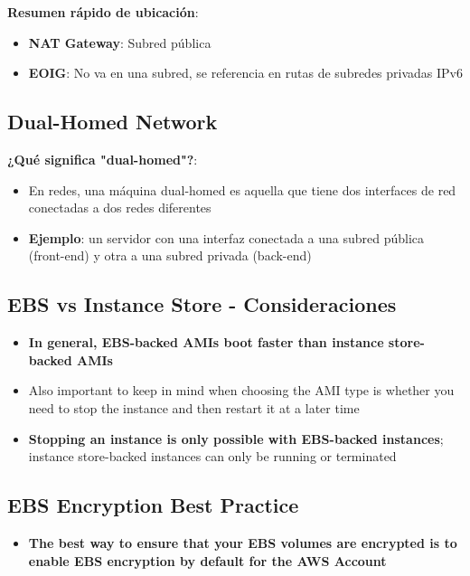 \documentclass[12pt,a4paper]{report}
\newcommand{\important}[1]{\textcolor{dangerred}{\textbf{#1}}}
\begin{document}
\textbf{Resumen rápido de ubicación}:
\begin{itemize}
    \item \textbf{NAT Gateway}: Subred pública
    \item \textbf{EOIG}: No va en una subred, se referencia en rutas de subredes privadas IPv6
\end{itemize}

\subsection{Dual-Homed Network}

\textbf{¿Qué significa "dual-homed"?}:
\begin{itemize}
    \item En redes, una máquina dual-homed es aquella que tiene dos interfaces de red conectadas a dos redes diferentes
    \item \textbf{Ejemplo}: un servidor con una interfaz conectada a una subred pública (front-end) y otra a una subred privada (back-end)
\end{itemize}

\subsection{EBS vs Instance Store - Consideraciones}

\begin{itemize}
    \item \important{In general, EBS-backed AMIs boot faster than instance store-backed AMIs}
    \item Also important to keep in mind when choosing the AMI type is whether you need to stop the instance and then restart it at a later time
    \item \textbf{Stopping an instance is only possible with EBS-backed instances}; instance store-backed instances can only be running or terminated
\end{itemize}

\subsection{EBS Encryption Best Practice}

\begin{itemize}
    \item \important{The best way to ensure that your EBS volumes are encrypted is to enable EBS encryption by default for the AWS Account}
\end{itemize}
\end{document}

